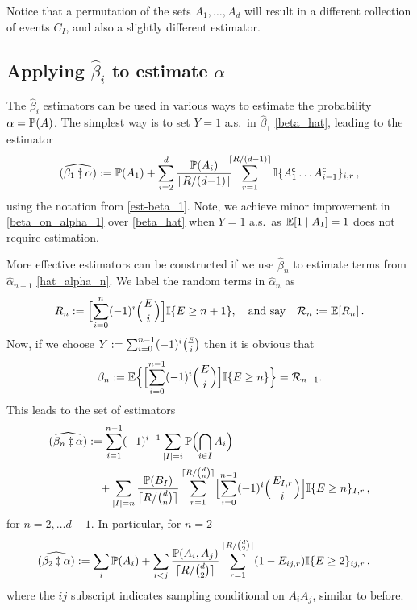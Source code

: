 Notice that a permutation of the sets $A_1,\dots,A_d$ will result in
a different collection of events $C_I$, and also a slightly different estimator.

\subsection{Applying $\hat{\beta}_i$ to estimate $\alpha$}

The $\hat{\beta}_i$ estimators can be used in various ways to estimate the probability
$\alpha=\operatorname{{\mathbb P}}(A)$. The simplest way is to set $Y=1$ a.s.\ in $\hat{\beta}_1$ \eqref{beta_hat},
leading to the estimator
\begin{align} \label{beta_on_alpha_1}
\widehat{(\beta_1 \ddagger \alpha)} := \operatorname{{\mathbb P}}(A_1) +
\sum_{i=2}^d \frac{\operatorname{{\mathbb P}}(A_i)}{\lceil R/(d{-}1) \rceil} \hspace{-5pt} \sum_{r=1}^{\lceil R/(d{-}1) \rceil}
	\mathbb{I}\{ A_1^{\mathsf{c}} \dots A_{i-1}^{\mathsf{c}} \}_{i,r}  \,,
\end{align}
using the notation from \eqref{est-beta_1}. Note, we achieve minor improvement in \eqref{beta_on_alpha_1} over \eqref{beta_hat} when $Y=1$ a.s.\ as $\operatorname{{\mathbb E}}[1 \mid A_1] = 1$ does not require estimation.

More effective estimators can be constructed if we use $\hat{\beta}_n$ to estimate terms from $\hat{\alpha}_{n-1}$ \eqref{hat_alpha_n}.
We label the random terms in $\hat{\alpha}_n$ as
\begin{equation}\label{residual}
 R_n \defeq \Bigl[ \sum_{i=0}^n (-1)^{i} \BigBinom{E}{i} \Bigr] \ind{ E \ge n+1}, \quad \text{and say} \quad \mathcal{R}_n \defeq\Exp[R_n] \,.
\end{equation}
Now, if we choose $Y:=\sum_{i=0}^{n-1} (-1)^{i} \binom{E}{i}$ then it is obvious that
\begin{equation*}
 \beta_n\defeq\Exp\Bigl\{ \Bigl[ \sum_{i=0}^{n-1} (-1)^{i} \BigBinom{E}{i} \Bigr] \ind{ E \ge n} \Bigr\}=\mathcal{R}_{n-1}.
\end{equation*}
This leads to the set of estimators
\begin{align*}
	\widehat{(\beta_n \ddagger \alpha)}
	&\defeq \sum_{i=1}^{n-1} (-1)^{i-1} \sum_{\card{I}=i} \Prob\Bigl( \bigcap_{i\in I} A_i \Bigr) \\
	&\quad +
	\sum_{\card{I}=n} \frac{ \Prob(B_I) }{\lceil R/\binom{d}{n} \rceil}
   \sum_{r=1}^{\lceil R/\binom{d}{n} \rceil}
   \Bigl[ \sum_{i=0}^{n-1} (-1)^{i} \BigBinom{E_{I,r}}{i} \Bigr]
	\ind{ E \ge n }_{I,r} \,,
\end{align*}%
for $n = 2, \dots d-1$.
In particular, for $n=2$
\begin{align} \label{beta_on_alpha_2}
	\widehat{(\beta_2 \ddagger \alpha)}
	&:= \sum_i \operatorname{{\mathbb P}}(A_i) +
	\sum_{i<j} \frac{ \operatorname{{\mathbb P}}(A_i, A_j) }{\lceil R/\binom{d}{2} \rceil}
   \sum_{r=1}^{\lceil R/\binom{d}{2} \rceil}
   (1 - E_{ij,r}) \mathbb{I}\{  E \ge 2  \}_{ij,r} \,,
\end{align}
where the $ij$ subscript indicates sampling conditional on $A_iA_j$, similar to before.

